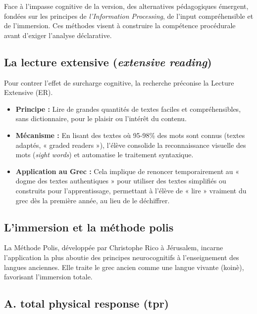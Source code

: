 Face à l'impasse cognitive de la version, des alternatives pédagogiques émergent, fondées sur les
principes de \textit{l'Information Processing}, de l'input compréhensible et de l'immersion. Ces
méthodes visent à construire la compétence procédurale avant d'exiger l'analyse déclarative.



\subsection{La lecture extensive (\textit{extensive reading})}

Pour contrer l'effet de surcharge cognitive, la recherche préconise la Lecture Extensive
(ER).\cite{II-3-1-ref23}

\begin{itemize}\item \textbf{Principe :} Lire de grandes quantités de textes faciles et compréhensibles, sans dictionnaire, pour le plaisir ou l'intérêt du contenu.\item \textbf{Mécanisme :} En lisant des textes où 95-98\% des mots sont connus (textes adaptés, « graded readers »), l'élève consolide la reconnaissance visuelle des mots (\textit{sight words}) et automatise le traitement syntaxique.\cite{II-3-1-ref21}\item \textbf{Application au Grec :} Cela implique de renoncer temporairement au « dogme des textes authentiques » pour utiliser des textes simplifiés ou construits pour l'apprentissage, permettant à l'élève de « lire » vraiment du grec dès la première année, au lieu de le déchiffrer.\cite{II-3-1-ref56}\end{itemize}

\subsection{L'immersion et la méthode polis}

La Méthode Polis, développée par Christophe Rico à Jérusalem, incarne l'application la plus aboutie
des principes neurocognitifs à l'enseignement des langues anciennes.\cite{II-3-1-ref58} Elle traite
le grec ancien comme une langue vivante (koinè), favorisant l'immersion totale.



\subsection{A. total physical response (tpr)}

